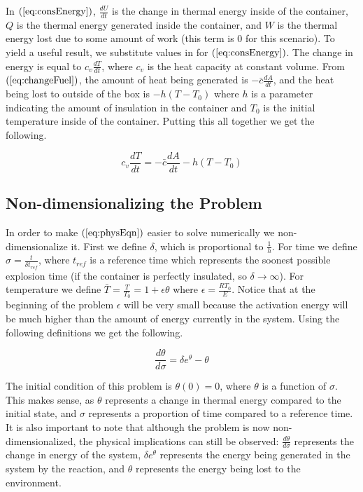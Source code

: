 \documentclass[12pt]{article}\pagestyle{myheadings}
\theoremstyle{plain}
\begin{document}
In $(\ref{eq:consEnergy})$, $\frac{dU}{dt}$ is the change in thermal energy inside of the container, $Q$ is the thermal energy generated inside the container, and $W$ is the thermal energy lost due to some amount of work (this term is 0 for this scenario). To yield a useful result, we substitute values in for $(\ref{eq:consEnergy})$. The change in energy is equal to $c_{v} \frac{dT}{dt}$, where $c_{v}$ is the heat capacity at constant volume. From $(\ref{eq:changeFuel})$, the amount of heat being generated is $- \bar{c} \frac{dA}{dt}$, and the heat being lost to outside of the box is $-h (T - T_{0})$ where $h$ is a parameter indicating the amount of insulation in the container and $T_{0}$ is the initial temperature inside of the container. Putting this all together we get the following.

\begin{equation}\label{eq:physEqn}
c_{v} \frac{dT}{dt} = - \bar{c} \frac{dA}{dt} -h (T - T_{0})
\end{equation}

\subsection{Non-dimensionalizing the Problem}
In order to make $(\ref{eq:physEqn})$ easier to solve numerically we non-dimensionalize it. First we define $\delta$, which is proportional to $\frac{1}{h}$. For time we define $\sigma = \frac{t}{\delta t_{ref}}$, where $t_{ref}$ is a reference time which represents the soonest possible explosion time (if the container is perfectly insulated, so $\delta \rightarrow \infty$). For temperature we define $\bar{T} = \frac{T}{T_{0}} = 1 + \epsilon \theta$ where $\epsilon = \frac{RT_{0}}{E}$. Notice that at the beginning of the problem $\epsilon$ will be very small because the activation energy will be much higher than the amount of energy currently in the system. Using the following definitions we get the following.

\begin{equation}\label{eq:nonDEq}
\frac{d\theta}{d\sigma} = \delta e^{\theta} - \theta
\end{equation}

The initial condition of this problem is $\theta(0) = 0$, where $\theta$ is a function of $\sigma$. This makes sense, as $\theta$ represents a change in thermal energy compared to the initial state, and $\sigma$ represents a proportion of time compared to a reference time. It is also important to note that although the problem is now non-dimensionalized, the physical implications can still be observed: $\frac{d\theta}{d\sigma}$ represents the change in energy of the system, $\delta e^{\theta}$ represents the energy being generated in the system by the reaction, and $\theta$ represents the energy being lost to the environment.
\end{document}
